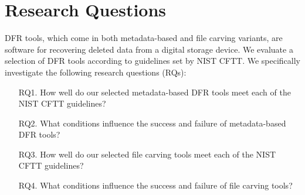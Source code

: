 \section{Research Questions} \label{rqs}

DFR tools, which come in both metadata-based and file carving variants, are software for recovering deleted data from a digital storage device.
We evaluate a selection of DFR tools according to guidelines set by NIST CFTT.
We specifically investigate the following research questions (RQs):

\begin{itemize}
\item[RQ1.] How well do our selected metadata-based DFR tools meet each of the NIST CFTT guidelines?

\item[RQ2.] What conditions influence the success and failure of metadata-based DFR tools?

\item[RQ3.] How well do our selected file carving tools meet each of the NIST CFTT guidelines?

\item[RQ4.] What conditions influence the success and failure of file carving tools?
\end{itemize}


 
